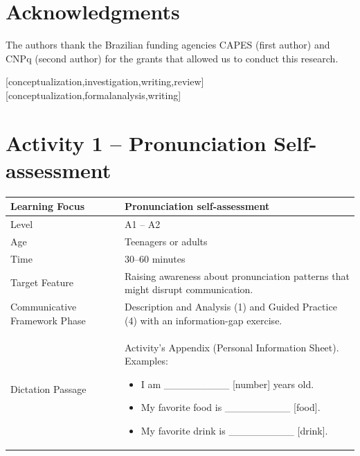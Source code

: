 \documentclass[english]{textolivre}
\begin{document}
\section{Acknowledgments}\label{acknowledgments}

The authors thank the Brazilian funding agencies CAPES (first author)
and CNPq (second author) for the grants that allowed us to conduct this
research.


\printbibliography\label{sec-bib}


\begin{contributors}
[conceptualization,investigation,writing,review]
[conceptualization,formalanalysis,writing]
\end{contributors}


\appendix 
\section{Activity 1 -- Pronunciation Self-assessment}\label{apdx1}

\begin{tabular}{|m{3cm}|p{10cm}|}
\hline
Learning Focus & Pronunciation self-assessment \\
\hline
Level & A1 -- A2 \\
\hline
Age & Teenagers or adults \\
\hline
Time & 30--60 minutes \\
\hline
Target Feature & Raising awareness about pronunciation patterns that might disrupt communication. \\
\hline
Communicative Framework Phase & Description and Analysis (1) and Guided Practice (4) with an information-gap exercise. \\
\hline
Dictation Passage & Activity's Appendix (Personal Information Sheet). Examples: \newline
\begin{itemize}
    \item I am \_\_\_\_\_\_\_\_\_ [number] years old. 
    \item My favorite food is \_\_\_\_\_\_\_\_\_ [food].
    \item My favorite drink is \_\_\_\_\_\_\_\_\_ [drink].
\end{itemize}

\\
\hline
\end{tabular}
\end{document}
